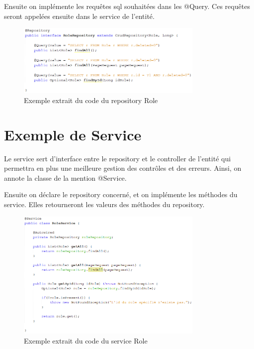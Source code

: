 		\noindent
		Ensuite on implémente les requêtes sql souhaitées dans les @Query. Ces requêtes seront appelées ensuite dans le service de l'entité.

		\begin{figure}[H]
			\centering\includegraphics[width=0.80\textwidth, keepaspectratio]{res/repository.png}
			\caption{Exemple extrait du code du repository Role}
		\end{figure}

	\section{Exemple de Service}
		Le service sert d’interface entre le repository et le controller de l'entité qui permettra en plus une meilleure gestion des contrôles et des erreurs.\newline
		Ainsi, on annote la classe de la mention @Service. \newline

		\noindent
		Ensuite on déclare le repository concerné, et on implémente les méthodes du service. Elles retourneront les valeurs des méthodes du repository.

		\begin{figure}[H]
			\centering\includegraphics[width=0.80\textwidth, keepaspectratio]{res/service.png}
			\caption{Exemple extrait du code du service Role}
		\end{figure}

